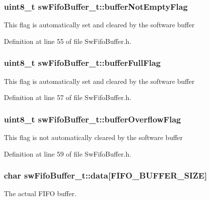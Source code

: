 \subsubsection[{buffer\+Not\+Empty\+Flag}]{\setlength{\rightskip}{0pt plus 5cm}uint8\+\_\+t sw\+Fifo\+Buffer\+\_\+t\+::buffer\+Not\+Empty\+Flag}\label{structsw_fifo_buffer__t_a5c7c40846fb9a0ce25dba8e99824ad8a}
This flag is automatically set and cleared by the software buffer 

Definition at line 55 of file Sw\+Fifo\+Buffer.\+h.

\hypertarget{structsw_fifo_buffer__t_a8c291f4e2fda846402115081e5a750e7}{}
\subsubsection[{buffer\+Full\+Flag}]{\setlength{\rightskip}{0pt plus 5cm}uint8\+\_\+t sw\+Fifo\+Buffer\+\_\+t\+::buffer\+Full\+Flag}\label{structsw_fifo_buffer__t_a8c291f4e2fda846402115081e5a750e7}
This flag is automatically set and cleared by the software buffer 

Definition at line 57 of file Sw\+Fifo\+Buffer.\+h.

\hypertarget{structsw_fifo_buffer__t_a9bbab1b668fb5a7f96f07478634a50f6}{}
\subsubsection[{buffer\+Overflow\+Flag}]{\setlength{\rightskip}{0pt plus 5cm}uint8\+\_\+t sw\+Fifo\+Buffer\+\_\+t\+::buffer\+Overflow\+Flag}\label{structsw_fifo_buffer__t_a9bbab1b668fb5a7f96f07478634a50f6}
This flag is not automatically cleared by the software buffer 

Definition at line 59 of file Sw\+Fifo\+Buffer.\+h.

\hypertarget{structsw_fifo_buffer__t_a0b595a1d13af47083fedafee8e29e26e}{}
\subsubsection[{data}]{\setlength{\rightskip}{0pt plus 5cm}char sw\+Fifo\+Buffer\+\_\+t\+::data\mbox{[}{\bf F\+I\+F\+O\+\_\+\+B\+U\+F\+F\+E\+R\+\_\+\+S\+I\+Z\+E}\mbox{]}}\label{structsw_fifo_buffer__t_a0b595a1d13af47083fedafee8e29e26e}
The actual F\+I\+F\+O buffer. 

